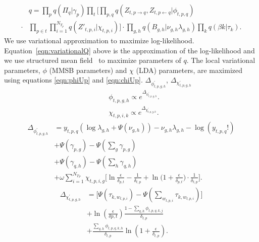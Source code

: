 \documentclass{sig-alternate}
\begin{document}
\vspace*{-1\baselineskip}
\small
\begin{align}
	&q = \prod_{p}q(\Pi_{q} | \gamma_{p}) \prod_{t} \bigg[ \prod_{p, q} \! 
q(Z_{t, p \rightarrow q}, Z_{t, p \leftarrow q} | \phi_{t,p,q})  \nonumber\\ 
\cdot &\prod_{p \in t} \prod_{i=1}^{N_{T_{p}}} q(Z'_{t,p,i} | \chi_{t,p,i})
\bigg] %
\cdot \prod_{g,h} q(B_{g,h} | \nu_{g,h} \lambda_{g,h}) \prod_{k} q(\beta{k} |
\tau_{k}).
\label{eqn:variationalQ}
\end{align}
\normalsize
We use variational approximation to maximize log-likelihood.
Equation~\ref{eqn:variationalQ} above is the approximation of the log-likelihood and we
use structured mean field~\cite{Xing_et_al:2003} to maximize parameters of $q$.
The local variational parameters, $\phi$ (MMSB parameters) and $\chi$ (LDA)
parameters, are maximized using equations \ref{eqn:phiUp} and \ref{eqn:chiUp}.
$\Delta_{\phi^{'}_{t,p,g,h}}$, $\Delta_{\chi^{'}_{t,p,g,h}}$ 
\vspace*{-1\baselineskip}
\small
\begin{align}
	&\phi_{t,p,g,h} \propto e^{\Delta_{\phi^{'}_{t,p,g,h}}}.
\label{eqn:phiUp}                                 \\
&\chi_{t,p,i,k} \propto e^{\Delta_{\chi^{'}_{t,p,g,h}}}.
\label{eqn:chiUp}
\end{align}
\vspace*{-1\baselineskip}
\begin{align}
\Delta_{\phi^{'}_{t,p,g,h}} &= y_{t,p,q}( \log \! \lambda_{g,h} + 
\Psi(\nu_{g,h})) - \nu_{g,h} \lambda_{g,h} - \log \! (y_{t,p,q}!)
\nonumber \\ & + \Psi(\gamma_{p,g}) - \Psi(\sum_{g} \gamma_{p,g})
\nonumber \\  & + \Psi(\gamma_{q,h}) - \Psi(\sum_{h} \gamma_{q,h})
\nonumber \\  & + \omega\sum_{i=1}^{N_{T_{P}}} \! \chi_{t,p,i,g} 
\bigg[ \ln \! \frac{\epsilon}{\delta_{p,t}} - \frac{1}{\delta_{t,p}} 
+ \ln \bigg( 1 + \frac{\epsilon}{\delta_{p,t}} \bigg) 
\cdot \frac{1}{\delta_{t,p}} \bigg].
\label{eqn:phiDelta}
\end{align}
\vspace*{-1\baselineskip}
\begin{align}
\Delta_{\chi^{'}_{t,p,g,h}} &= \bigg[ \Psi(\tau_{k,w_{t,p,i}}) - 
\Psi(\sum_{w_{t,p,i}} \! \tau_{k, w_{t,p,i}}) \bigg]
\nonumber \\  & + \ln \! (\frac{\epsilon}{\delta{p,t}}) \frac{1 - 
\sum_{q,h} \! \phi_{t,p,q,k,j}}{\delta_{t,p}} 
\nonumber\\  & + \frac{\sum_{q,h} \phi_{t,p,q,k,h}}{\delta_{t,p}} 
\ln \! (1 + \frac{\epsilon}{\delta_{t,p}}).
\label{eqn:chiDelta}
\end{align}
\end{document}
